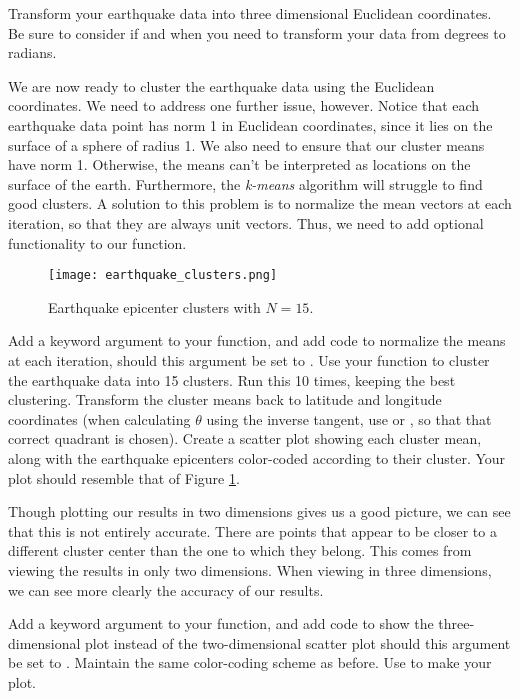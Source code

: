 \begin{problem}
Transform your earthquake data into three dimensional Euclidean coordinates.
Be sure to consider if and when you need to transform your data from degrees to radians.
\end{problem}

We are now ready to cluster the earthquake data using the Euclidean coordinates.
We need to address one further issue, however.
Notice that each earthquake data point has norm 1 in Euclidean coordinates, since it lies on the surface of a sphere of radius 1.
We also need to ensure that our cluster means have norm 1.
Otherwise, the means can't be interpreted as locations on the surface of the earth.
Furthermore, the \emph{k-means} algorithm will struggle to find good clusters.
A solution to this problem is to normalize the mean vectors at each iteration, so that they are always unit vectors.
Thus, we need to add optional functionality to our  function.
\begin{figure}
	\centering
	\texttt{[image: earthquake\_clusters.png]}
	\caption{Earthquake epicenter clusters with $N = 15$.}
	\label{fig:earthquakeclusters}
\end{figure}

\begin{problem}
Add a keyword argument  to your  function, and add code to normalize the means at each iteration, should this argument be set to .
Use your function to cluster the earthquake data into 15 clusters. Run this 10 times, keeping the best clustering.
Transform the cluster means back to latitude and longitude coordinates (when calculating $\theta$ using the inverse tangent, use  or ,
so that that correct quadrant is chosen).
Create a scatter plot showing each cluster mean, along with the earthquake epicenters color-coded according to their cluster. Your plot should resemble that of Figure \ref{fig:earthquakeclusters}.
\end{problem}

Though plotting our results in two dimensions gives us a good picture, we can see that this is not entirely accurate.  There are points that appear to be closer to a different cluster center than the one to which they belong.  This comes from viewing the results in only two dimensions.  When viewing in three dimensions, we can see more clearly the accuracy of our results.  
\begin{problem}
Add a keyword argument  to your  function, and add code to show the three-dimensional plot instead of the two-dimensional scatter plot should this argument be set to .  Maintain the same color-coding scheme as before.  Use  to make your plot.
\end{problem}



